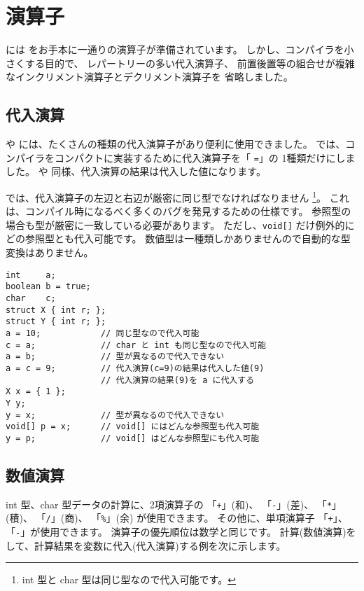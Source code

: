 \section{演算子}

\cmml には \cl をお手本に一通りの演算子が準備されています。
しかし、コンパイラを小さくする目的で、
レパートリーの多い代入演算子、
前置後置等の組合せが複雑なインクリメント演算子とデクリメント演算子を
省略しました。

\subsection{代入演算}

\cl や \javal には、たくさんの種類の代入演算子があり便利に使用できました。
\cmml では、コンパイラをコンパクトに実装するために代入演算子を「 \verb/=/」の
1種類だけにしました。
\cl や \javal 同様、代入演算の結果は代入した値になります。

\cmml では、代入演算子の左辺と右辺が厳密に同じ型でなければなりません
\footnote{int 型と char 型は同じ型なので代入可能です。}。
これは、コンパイル時になるべく多くのバグを発見するための仕様です。
参照型の場合も型が厳密に一致している必要があります。
ただし、\verb/void[]/ だけ例外的にどの参照型とも代入可能です。
数値型は一種類しかありませんので自動的な型変換はありません。

\begin{mylist}
\begin{verbatim}
int     a;
boolean b = true;
char    c;
struct X { int r; };
struct Y { int r; };
a = 10;            // 同じ型なので代入可能
c = a;             // char と int も同じ型なので代入可能
a = b;             // 型が異なるので代入できない
a = c = 9;         // 代入演算(c=9)の結果は代入した値(9)
                   // 代入演算の結果(9)を a に代入する
X x = { 1 };
Y y;
y = x;             // 型が異なるので代入できない
void[] p = x;      // void[] にはどんな参照型も代入可能
y = p;             // void[] はどんな参照型にも代入可能
\end{verbatim}
\end{mylist}

\subsection{数値演算}

int 型、char 型データの計算に、2項演算子の
「\verb/+/」(和)、
「\verb/-/」(差)、
「\verb/*/」(積)、
「\verb+/+」(商)、
「\verb/%/」(余)
が使用できます。
その他に、単項演算子
「\verb/+/」、
「\verb/-/」が使用できます。
演算子の優先順位は数学と同じです。
計算(数値演算)をして、計算結果を変数に代入(代入演算)する例を次に示します。

